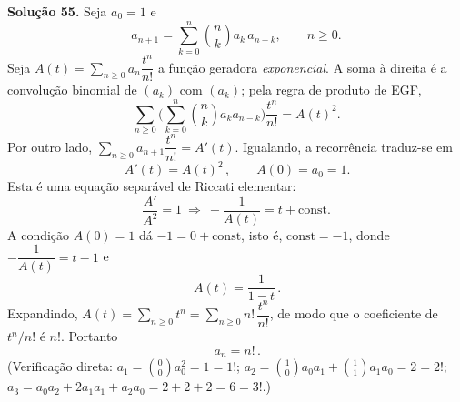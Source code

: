 \bigskip\noindent\textbf{Solução 55.}\quad
Seja $a_0=1$ e
\[
a_{n+1}=\sum_{k=0}^n\binom{n}{k}a_k\,a_{n-k},\qquad n\ge0.
\]
Seja $A(t)=\sum_{n\ge0}a_n\dfrac{t^n}{n!}$ a função geradora \emph{exponencial}. A soma à direita é a convolução binomial de $(a_k)$ com $(a_k)$; pela regra de produto de EGF,
\[
\sum_{n\ge0}\Big(\sum_{k=0}^n\binom{n}{k}a_k a_{n-k}\Big)\frac{t^n}{n!}=A(t)^2.
\]
Por outro lado, $\sum_{n\ge0}a_{n+1}\dfrac{t^n}{n!}=A'(t)$. Igualando, a recorrência traduz-se em
\begin{equation}\label{eq:55ode}
\boxed{\,A'(t)=A(t)^2\,},\qquad A(0)=a_0=1.
\end{equation}
Esta é uma equação separável de Riccati elementar:
\[
\frac{A'}{A^2}=1\ \Longrightarrow\ -\frac{1}{A(t)}=t+\text{const}.
\]
A condição $A(0)=1$ dá $-1=0+\text{const}$, isto é, $\text{const}=-1$, donde $-\dfrac1{A(t)}=t-1$ e
\[
\boxed{\,A(t)=\frac{1}{1-t}\,}.
\]
Expandindo, $A(t)=\sum_{n\ge0}t^n=\sum_{n\ge0}n!\,\dfrac{t^n}{n!}$, de modo que o coeficiente de $t^n/n!$ é $n!$. Portanto
\[
\boxed{\,a_n=n!\,}.
\]
(Verificação direta: $a_1=\binom00 a_0^2=1=1!$; $a_2=\binom10 a_0a_1+\binom11 a_1a_0=2=2!$; $a_3=a_0a_2+2a_1a_1+a_2a_0=2+2+2=6=3!$.)
